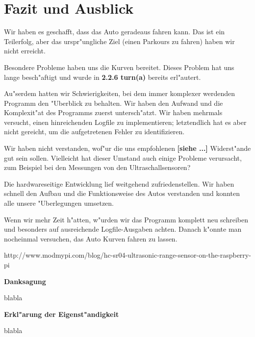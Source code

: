 \documentclass[a4paper,12pt]{article}
\begin{document}
\section{Fazit und Ausblick}\label{sec3}

Wir haben es geschafft, dass das Auto geradeaus fahren kann.
Das ist ein Teilerfolg, aber das urspr"ungliche Ziel (einen Parkours zu fahren) haben wir nicht erreicht.

Besondere Probleme haben uns die Kurven bereitet. Dieses Problem hat uns lange besch"aftigt und wurde in {\bf 2.2.6 turn(a)} bereits erl"autert.

Au"serdem hatten wir Schwierigkeiten, bei dem immer komplexer werdenden Programm den "Uberblick zu behalten.
Wir haben den Aufwand und die Komplexit"at des Programms zuerst untersch"atzt.
Wir haben mehrmals versucht, einen hinreichenden Logfile zu implementieren; letztendlich hat es aber nicht gereicht, um die aufgetretenen Fehler zu identifizieren.

Wir haben nicht verstanden, wof"ur die uns empfohlenen {\bf [siehe ...]} Widerst"ande gut sein sollen.
Vielleicht hat dieser Umstand auch einige Probleme verursacht, zum Beispiel bei den Messungen von den Ultraschallsensoren?

Die hardwareseitige Entwicklung lief weitgehend zufriedenstellen.
Wir haben schnell den Aufbau und die Funktionsweise des Autos verstanden und konnten alle unsere "Uberlegungen umsetzen.

Wenn wir mehr Zeit h"atten, w"urden wir das Programm komplett neu schreiben und besonders auf ausreichende Logfile-Ausgaben achten.
Danach k"onnte man nocheinmal versuchen, das Auto Kurven fahren zu lassen.

\bigskip


\begin{thebibliography}{99}
	\itemsep-2pt \small
	 http://www.modmypi.com/blog/hc-sr04-ultrasonic-range-sensor-on-the-raspberry-pi %
\end{thebibliography}

\newpage


{\large\bf Danksagung}

\medskip

blabla

\bigskip


{\large\bf Erkl"arung der Eigenst"andigkeit}

\medskip

blabla
\end{document}
